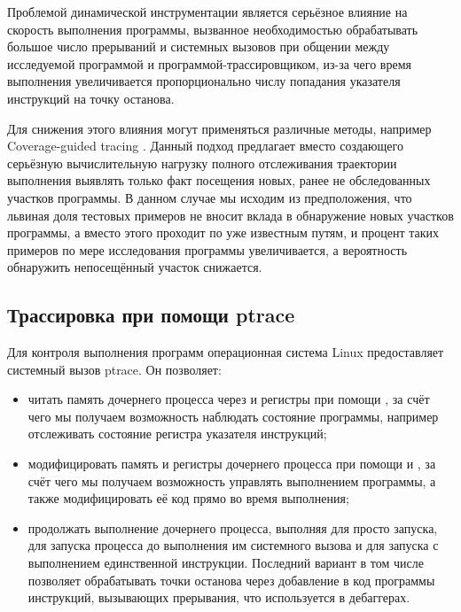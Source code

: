 Проблемой динамической инструментации является серьёзное влияние на скорость выполнения программы, вызванное необходимостью обрабатывать большое число прерываний и системных вызовов при общении между исследуемой программой и программой-трассировщиком, из-за чего время выполнения увеличивается пропорционально числу попадания указателя инструкций на точку останова.

Для снижения этого влияния могут применяться различные методы, например Coverage-guided tracing \cite{full-speed-fuzzing}. Данный подход предлагает вместо создающего серьёзную вычислительную нагрузку полного отслеживания траектории выполнения выявлять только факт посещения новых, ранее не обследованных участков программы. В данном случае мы исходим из предположения, что львиная доля тестовых примеров не вносит вклада в обнаружение новых участков программы, а вместо этого проходит по уже известным путям, и процент таких примеров по мере исследования программы увеличивается, а вероятность обнаружить непосещённый участок снижается.

\subsection{Трассировка при помощи ptrace}

Для контроля выполнения программ операционная система Linux предоставляет системный вызов ptrace. Он позволяет:

\begin{itemize}
	\item читать память дочернего процесса через  и регистры при помощи , за счёт чего мы получаем возможность наблюдать состояние программы, например отслеживать состояние регистра указателя инструкций;
	
	\item модифицировать память и регистры дочернего процесса при помощи  и , за счёт чего мы получаем возможность управлять выполнением программы, а также модифицировать её код прямо во время выполнения;
	
	\item продолжать выполнение дочернего процесса, выполняя  для просто запуска,  для запуска процесса до выполнения им системного вызова и  для запуска с выполнением единственной инструкции. Последний вариант в том числе позволяет обрабатывать точки останова через добавление в код программы инструкций, вызывающих прерывания, что используется в дебаггерах.
\end{itemize}


